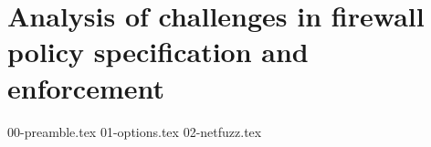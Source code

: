 \chapter{Analysis of challenges in firewall policy specification and enforcement}
\label{extend:chapter}

{00-preamble.tex}
{01-options.tex}
{02-netfuzz.tex}

